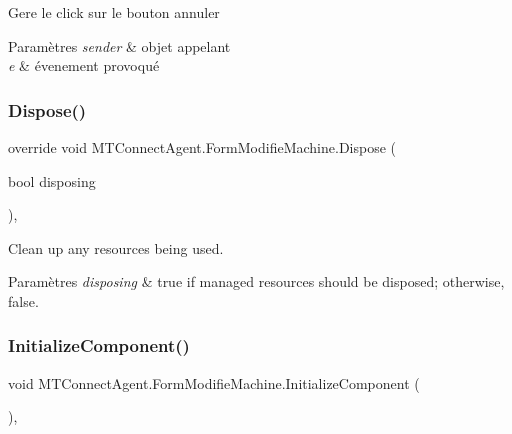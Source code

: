 Gere le click sur le bouton annuler 


\begin{DoxyParams}{Paramètres}
{\em sender} & objet appelant\\
\hline
{\em e} & évenement provoqué\\
\hline
\end{DoxyParams}
\mbox{\label{class_m_t_connect_agent_1_1_form_modifie_machine_a8218fb0e59b46bb90bbc3567f09e910c}} 
\subsubsection{\texorpdfstring{Dispose()}{Dispose()}}
{\footnotesize\ttfamily override void M\+T\+Connect\+Agent.\+Form\+Modifie\+Machine.\+Dispose (\begin{DoxyParamCaption}\item[{bool}]{disposing }\end{DoxyParamCaption})\hspace{0.3cm}{\ttfamily [inline]}, {\ttfamily [protected]}}



Clean up any resources being used. 


\begin{DoxyParams}{Paramètres}
{\em disposing} & true if managed resources should be disposed; otherwise, false.\\
\hline
\end{DoxyParams}
\mbox{\label{class_m_t_connect_agent_1_1_form_modifie_machine_aa8266f231d02b13a7090ac5cfe2e9600}} 
\subsubsection{\texorpdfstring{Initialize\+Component()}{InitializeComponent()}}
{\footnotesize\ttfamily void M\+T\+Connect\+Agent.\+Form\+Modifie\+Machine.\+Initialize\+Component (\begin{DoxyParamCaption}{ }\end{DoxyParamCaption})\hspace{0.3cm}{\ttfamily [inline]}, {\ttfamily [private]}}



